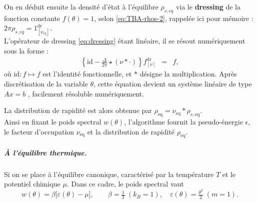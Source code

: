 On en déduit ensuite la densité d'état à l'équilibre $\rho_{s,eq}$ via le {\bf dressing}  de la fonction constante $f(\theta) = 1$, selon \eqref{eq:TBA-rhos-2}, rappelée ici pour mémoire : $ 2\pi \rho_{s,eq}  =  1^{\mathrm{dr}}_{[\nu_{\! eq}]}$.\\

L’opérateur de dressing \eqref{eq:dressing} étant linéaire, il se résout numériquement sous la forme :
\begin{eqnarray*}
	\left\{ \mathrm{id} - \frac{\Delta}{2\pi} \star ( \nu \ast \cdot ) \right\} f^{\mathrm{dr}}_{[\nu]} & = & f,\label{eq:TBA:rho_s:num}
\end{eqnarray*}
où $\mathrm{id} \colon f \mapsto f$ est l’identité fonctionnelle, et $\ast$ désigne la multiplication.
Après discrétisation de la variable $\theta$, cette équation devient un système linéaire de type $Ax=b$ , facilement résoluble numériquement.

La distribution de rapidité est alors obtenue par $\rho_{\!\mathrm{eq}} = \nu_{\!\mathrm{eq}} \ast \rho_{\! s,\mathrm{eq}}$.\\

\medskip
Ainsi en fixant le poids spectral $w(\theta)$, l’algorithme fournit la pseudo-énergie \( \epsilon \), le facteur d’occupation \( \nu_{\mathrm{eq}} \) et la distribution de rapidité \( \rho_{\!\mathrm{eq}} \).

\medskip
\subparagraph{À l'équilibre thermique.} 
Si on se place à l’équilibre canonique, caractérisé par la température \( T \) et le potentiel chimique \( \mu \).  Dans ce cadre, le poids spectral vaut
\begin{equation}
  w(\theta)=\beta\bigl[\varepsilon(\theta)-\mu\bigr],\qquad\beta=\tfrac1T\; (k_B = 1 ),\quad\varepsilon(\theta)=\tfrac{\theta^{2}}{2}\;(m=1).\label{eq:TBA:w:canonical}
\end{equation}
%




		

